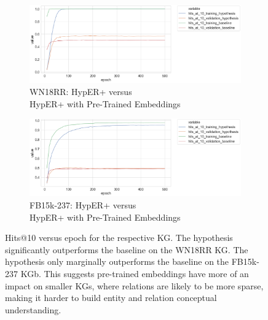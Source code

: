 \bigskip

\begin{figure}[H]
	\begin{subfigure}[b]{.5\linewidth}
   		\centering
    		\includegraphics[width=1.0\linewidth, height=0.5\linewidth]{WN18RR_hits_at_10_Results_ptwv}
		\captionsetup{justification=centering}
		\caption{WN18RR: HypER+ versus \\ HypER+ with Pre-Trained Embeddings}
	\end{subfigure}
	\begin{subfigure}[b]{.5\linewidth}
   		\centering
		\includegraphics[width=1.0\linewidth, height=0.5\linewidth]{FB15k-237_hits_at_10_Results_ptwv}
		\captionsetup{justification=centering}
		\caption{FB15k-237: HypER+ versus \\ HypER+ with Pre-Trained Embeddings}
	\end{subfigure}
	\caption{Hits@10 versus epoch for the respective KG. The hypothesis significantly outperforms the baseline on the WN18RR KG. The hypothesis only marginally outperforms the baseline on the FB15k-237 KGb. This suggests pre-trained embeddings have more of an impact on smaller KGs, where relations are likely to be more sparse, making it harder to build entity and relation conceptual understanding.}
\end{figure}


